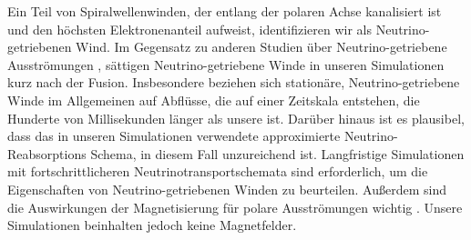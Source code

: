 
Ein Teil von Spiralwellenwinden, der entlang der polaren Achse kanalisiert ist und den höchsten
Elektronenanteil aufweist, identifizieren wir als Neutrino-getriebenen Wind. Im Gegensatz zu anderen Studien über 
Neutrino-getriebene Ausströmungen \citep[\eg][]{Dessart:2008zd,Perego:2014fma,Fujibayashi:2020dvr}, sättigen Neutrino-getriebene Winde in unseren Simulationen kurz nach der Fusion.
Insbesondere beziehen sich stationäre, Neutrino-getriebene Winde im Allgemeinen auf Abflüsse,
die auf einer Zeitskala entstehen, die Hunderte von Millisekunden länger als unsere ist. 
Darüber hinaus ist es plausibel, dass das in unseren Simulationen verwendete approximierte Neutrino-Reabsorptions 
Schema, in diesem Fall unzureichend ist. 
Langfristige Simulationen mit fortschrittlicheren 
Neutrinotransportschemata sind erforderlich, um die Eigenschaften von Neutrino-getriebenen Winden zu beurteilen.
Außerdem sind die Auswirkungen der Magnetisierung für polare Ausströmungen wichtig 
\citep{Siegel:2017nub,Metzger:2018uni,Fernandez:2018kax,Miller:2019dpt,Mosta:2020hlh}.
Unsere Simulationen beinhalten jedoch keine Magnetfelder. 



